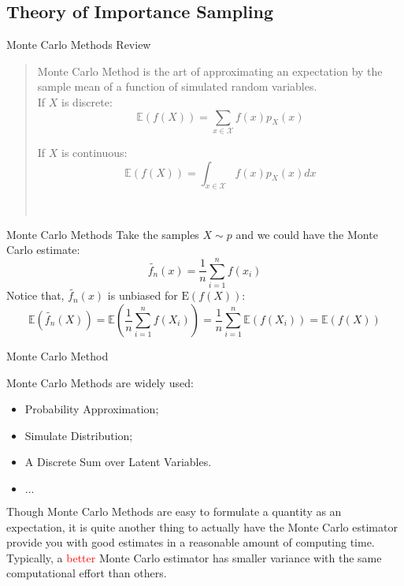 

\subsection{Theory of Importance Sampling}

% 

\begin{frame}{Monte Carlo Methods Review}

\begin{quote}
Monte Carlo Method is the art of approximating an expectation by the sample mean of a function of simulated random variables.\\
If $X$ is discrete:\\
\[\mathbb{E}(f(X))=\sum_{x \in \mathcal{X}} f(x) p_{X}(x)\]

If $X$ is continuous:\\
\[\mathbb{E}(f(X))=\int_{x \in \mathcal{X}} f(x) p_{X}(x) d x\]
\begin{flushright}
\textbf{}\\

\end{flushright}
\end{quote}
\end{frame}

\begin{frame}{Monte Carlo Methods}
Take the samples $X\sim p$ and we could have the Monte Carlo estimate:\\
\[\widetilde{f_{n}}(x)=\frac{1}{n} \sum_{i=1}^{n} f\left(x_{i}\right)\]
Notice that, $\widetilde{f_{n}}(x)$ is unbiased for $\mathrm{E}(f(X))$:\\
\[\mathbb{E}\left(\widetilde{f_{n}}(X)\right)=\mathbb{E}\left(\frac{1}{n} \sum_{i=1}^{n} f\left(X_{i}\right)\right)=\frac{1}{n} \sum_{i=1}^{n} \mathbb{E}\left(f\left(X_{i}\right)\right)=\mathbb{E}(f(X))\]
\end{frame}

\begin{frame}{Monte Carlo Method}

Monte Carlo Methods are widely used:

\begin{itemize}
\item Probability Approximation;\\
\item Simulate Distribution;\\ 
\item A Discrete Sum over Latent Variables.
\item $...$
\end{itemize}
Though Monte Carlo Methods are easy to formulate a quantity as an expectation, it is quite another thing to actually have the Monte Carlo estimator provide you with good estimates in a reasonable amount of computing time.\\
Typically, a \textcolor{red}{better} Monte Carlo estimator has smaller variance with the same computational effort than others.

\end{frame}

